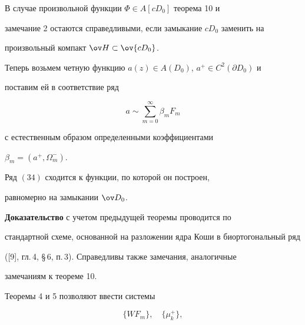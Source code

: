  


 


\begin{note} 


В случае произвольной функции $\Phi\in A[cD_0]$ теорема 10 и 


замечание 2 остаются справедливыми, если замыкание $cD_0$ заменить на 


произвольный компакт $\ov H\subset\ov{cD_0}$. 


\end{note} 


 


 


Теперь возьмем четную функцию $a(z)\in A(D_0)$, $a^+\in C^2(\partial D_0)$ и 


поставим ей в соответствие ряд 


\begin{equation} 


a\sim\sum^\infty_{m=0}\beta_m F_m 


\end{equation} 


с естественным образом определенными коэффициентами 


$\beta_m=(a^+,\Omega^-_m)$. 


 


 


\begin{thm} 


Ряд $(34)$ сходится к функции, по которой он построен, 


равномерно на замыкании $\ov D_0$. 


\end{thm} 


 


 


{\bf Доказательство} с учетом предыдущей теоремы проводится по 


стандартной схеме, основанной на разложении ядра Коши в биортогональный ряд 


([9], гл.\,4, \S\,6, п.\,3). Справедливы также замечания, аналогичные 


замечаниям к теореме 10. 


 


Теоремы 4 и 5 позволяют ввести системы 


\begin{equation} 


\{WF_m\},\quad \{\mu^+_k\}, 


\end{equation} 


